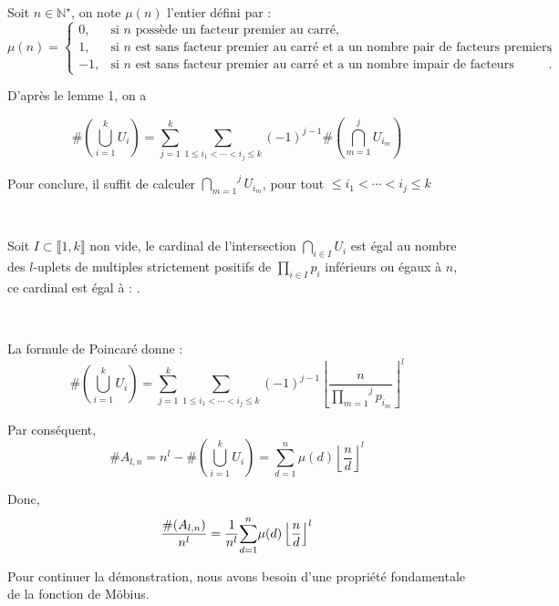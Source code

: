 Soit $n \in \mathbb{N}^{\star}$, on note $\mu (n)$ l'entier d{\'e}fini par :
\[
\mu(n) =
\begin{cases}
0, & \text{si } n \text{ possède un facteur premier au carré},\\[1mm]
1, & \text{si } n \text{ est sans facteur premier au carré et a un nombre pair de facteurs premiers},\\[1mm]
-1, & \text{si } n \text{ est sans facteur premier au carré et a un nombre impair de facteurs premiers}.
\end{cases}
\]



D'apr{\`e}s le lemme 1, on a

\[  \]
\[ \# \left( \underset{i = 1}{\overset{k}{\bigcup}} U_i \right) =
   \overset{k}{\underset{j = 1}{\sum}} \underset{1 \leqslant i_1 < \cdots <
   i_j \leqslant k}{\sum} (- 1)^{j - 1} \# \left( \overset{j}{\underset{m =
   1}{\bigcap}} U_{i_m} \right) \]


Pour conclure, il suffit de calculer $\overset{j}{\underset{m = 1}{\bigcap}}
U_{i_m}$, pour tout $\leqslant i_1 < \cdots < i_j \leqslant k$

\

Soit $I \subset \llbracket 1, k \rrbracket$ non vide, le cardinal de
l'intersection $\underset{i \in I}{\bigcap} U_i$ est {\'e}gal au nombre des
$l$-uplets de multiples strictement positifs de $\underset{i \in I}{\prod}
p_i$ inf{\'e}rieurs ou {\'e}gaux {\`a} $n$, ce cardinal est {\'e}gal {\`a} :
.

\

La formule de Poincar{\'e} donne :
\[ \# \left( \underset{i = 1}{\overset{k}{\bigcup}} U_i \right) =
   \overset{k}{\underset{j = 1}{\sum}} \underset{1 \leqslant i_1 < \cdots <
   i_j \leqslant k}{\sum} (- 1)^{j - 1} \left\lfloor
   \frac{n}{\overset{j}{\underset{m = 1}{\prod}} p_{i_m}} \right\rfloor^l \]


Par cons{\'e}quent,
\[ \#A_{l, n} = n^l -\# \left( \underset{i = 1}{\overset{k}{\bigcup}} U_i
   \right) = \underset{d = 1}{\overset{n}{\sum}} \mu (d) \left\lfloor
   \frac{n}{d} \right\rfloor^l \]


Donc,
\[ \tmcolor{red}{\tmcolor{black}{\frac{\# (A_{l, n})}{n^l} = \frac{1}{n^l}
   \underset{d = 1}{\overset{n}{\sum}} \mu (d) \left\lfloor \frac{n}{d}
   \right\rfloor^l}} \]


Pour continuer la d{\'e}monstration, nous avons besoin d'une propri{\'e}t{\'e}
fondamentale de la fonction de M{\"o}bius.

